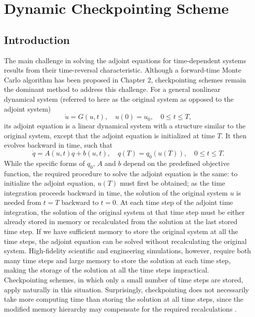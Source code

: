 \chapter{Dynamic Checkpointing Scheme}

\section{Introduction}

The main challenge in solving the adjoint equations for time-dependent systems
results from their time-reversal characteristic.
Although a forward-time Monte Carlo algorithm has been
proposed in Chapter 2, checkpointing schemes remain the
dominant method to address this challenge.  For a general
nonlinear dynamical system (referred to here as the original system as
opposed to the adjoint system)
\[
    \dot{u} = G(u, t), \quad u(0) = u_0, \quad 0 \le t \le T,
\]
its adjoint equation is a linear dynamical system with a structure similar to
the original system, except that the adjoint equation is initialized at time
$T$.  It then evolves backward in time, such that
\[
    \dot{q} = A(u, t) q + b(u, t), \quad q(T) = q_0(u(T)), \quad 0 \le t \le T.
\]
While the specific forms of $q_0$, $A$ and $b$ depend on the predefined
objective function, the required procedure to solve the adjoint equation is
the same: to initialize the adjoint equation, $u(T)$ must first be obtained; as
the time integration proceeds backward in time, the solution of the original
system $u$ is needed from $t=T$ backward to $t=0$.  At each time step of the
adjoint time integration, the solution of the original system at that time step
must be either already stored in memory or recalculated from the solution
at the last stored time step.  If we have sufficient memory to store the
original system at all the time steps, the adjoint equation can be solved
without recalculating the original system.  High-fidelity scientific and
engineering simulations, however, require both many time steps and large
memory to store the solution at each time step, making the storage of the
solution at all the time steps impractical.  Checkpointing schemes, in which
only a small number of time steps are stored, apply naturally in this situation.
Surprisingly, checkpointing does not necessarily take more computing time
than storing the solution at all time steps, since the modified memory
hierarchy may compensate
for the required recalculations \cite[]{andrea06}.

